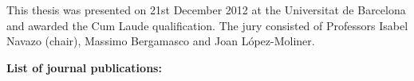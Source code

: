 \documentclass[
		twoside,openright,titlepage,numbers=noenddot,manychapters,
		headinclude,%
                footinclude=false,cleardoublepage=empty,
                BCOR=5mm,
		fontsize=11pt, %
                 enabledeprecatedfontcommands]{scrreprt}
\begin{document}
\begin{titlepage}
\begin{addmargin}[0cm]{0cm}
\vspace*{7.5cm}
\medskip


\begin{center}
\begin{minipage}{0.70\textwidth}
This thesis was presented on 21st December 2012 at the Universitat de
Barcelona and awarded the Cum Laude qualification. The jury consisted
of Professors Isabel Navazo (chair), Massimo Bergamasco and Joan
López-Moliner.\end{minipage}\end{center}

\medskip



\cleardoublepage

\begin{small} 
\begin{flushright}
\begin{minipage}{1.0\textwidth}

 {\bf List of journal publications:}


\end{minipage}
\end{flushright}
\end{small}
\end{addmargin}
\end{titlepage}
\end{document}
